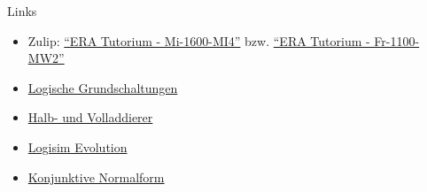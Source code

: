 \begin{frame}[fragile, c]{Links}{}
	\begin{itemize}
		\item Zulip: \href{https://zulip.in.tum.de/#narrow/stream/1917-ERA-Tutorium---Mi-1600-MI4}{\enquote{ERA Tutorium - Mi-1600-MI4}}
		      bzw. \href{https://zulip.in.tum.de/#narrow/stream/1940-ERA-Tutorium---Fr-1100-MW2}{\enquote{ERA Tutorium - Fr-1100-MW2}}
		\item \href{https://www.elektronik-kompendium.de/sites/dig/2609191.htm}{Logische Grundschaltungen}
		\item \href{https://www.elektronik-kompendium.de/sites/dig/0209031.htm}{Halb- und Volladdierer}
		\item \href{https://github.com/logisim-evolution/logisim-evolution/releases}{Logisim Evolution}
		\item \href{https://www.biancahoegel.de/logik/normalform_konjunktiv.html}{Konjunktive Normalform}
	\end{itemize}
\end{frame}

\maketitle


